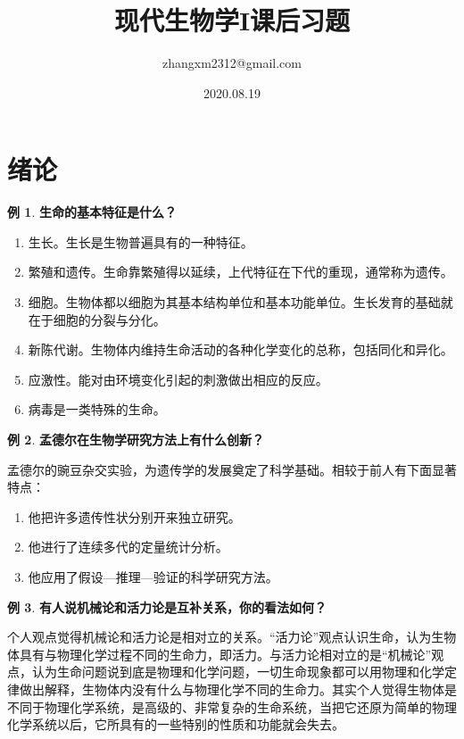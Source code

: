 \documentclass[UTF8]{article}
\title{现代生物学I课后习题}
\date{2020.08.19}
\author{zhangxm2312@gmail.com}
\theoremstyle{definition}
\newtheorem{example}{例}[section]
\begin{document}
\addtocounter{section}{-1}
\maketitle

\section{绪论}
\begin{example}\textbf{生命的基本特征是什么？}
    \begin{enumerate}
        \item 生长。生长是生物普遍具有的一种特征。
        \item 繁殖和遗传。生命靠繁殖得以延续，上代特征在下代的重现，通常称为遗传。
        \item 细胞。生物体都以细胞为其基本结构单位和基本功能单位。生长发育的基础就在于细胞的分裂与分化。
        \item 新陈代谢。生物体内维持生命活动的各种化学变化的总称，包括同化和异化。
        \item 应激性。能对由环境变化引起的刺激做出相应的反应。
        \item 病毒是一类特殊的生命。
    \end{enumerate}
\end{example}
\begin{example}\textbf{孟德尔在生物学研究方法上有什么创新？}

    孟德尔的豌豆杂交实验，为遗传学的发展奠定了科学基础。相较于前人有下面显著特点：
    \begin{enumerate}
        \item 他把许多遗传性状分别开来独立研究。
        \item 他进行了连续多代的定量统计分析。
        \item 他应用了假设---推理---验证的科学研究方法。
    \end{enumerate}
\end{example}
\begin{example}\textbf{有人说机械论和活力论是互补关系，你的看法如何？}
    
    个人观点觉得机械论和活力论是相对立的关系。“活力论”观点认识生命，认为生物体具有与物理化学过程不同的生命力，即活力。与活力论相对立的是“机械论”观点，认为生命问题说到底是物理和化学问题，一切生命现象都可以用物理和化学定律做出解释，生物体内没有什么与物理化学不同的生命力。其实个人觉得生物体是不同于物理化学系统，是高级的、非常复杂的生命系统，当把它还原为简单的物理化学系统以后，它所具有的一些特别的性质和功能就会失去。
\end{example}
\end{document}
